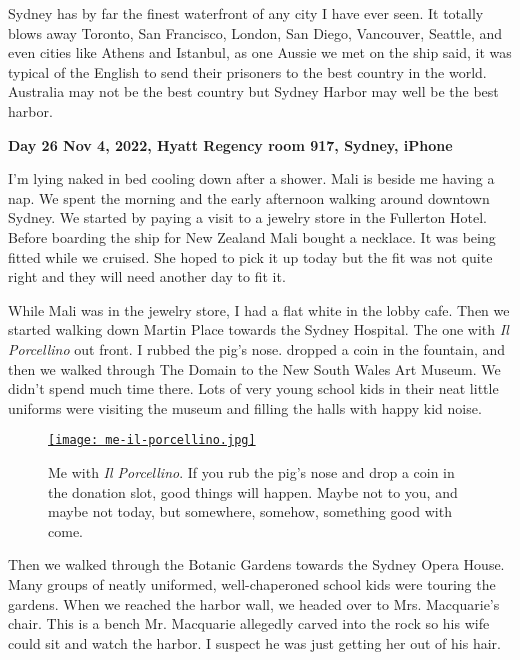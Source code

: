 Sydney has by far the finest waterfront of any city I have ever seen. It
totally blows away Toronto, San Francisco, London, San Diego, Vancouver,
Seattle, and even cities like Athens and Istanbul, as one Aussie we met
on the ship said, it was typical of the English to send their prisoners
to the best country in the world. Australia may not be the best country
but Sydney Harbor may well be the best harbor.

\textbf{Day 26 Nov 4, 2022, Hyatt Regency room 917, Sydney, iPhone}

I'm lying naked in bed cooling down after a shower. Mali is beside me
having a nap. We spent the morning and the early afternoon walking
around downtown Sydney. We started by paying a visit to a jewelry store
in the Fullerton Hotel. Before boarding the ship for New Zealand Mali bought a necklace. It was being fitted while we
cruised. She hoped to pick it up today but the fit was not quite right
and they will need another day to fit it.

While Mali was in the jewelry store, I had a flat white in the lobby
cafe. Then we started walking down Martin Place towards the Sydney
Hospital. The one with \emph{Il Porcellino} out front. I rubbed the
pig's nose. dropped a coin in the fountain, and then we walked through
The Domain to the New South Wales Art Museum. We didn't spend much time
there. Lots of very young school kids in their neat little uniforms were
visiting the museum and filling the halls with happy kid noise.


\captionsetup[figure]{labelformat=empty}
\begin{SCfigure}
 \centering
\href{https://conceptcontrol.smugmug.com/Trips/Overseas/Australia-New-Zealand-2022/i-kKGfSRz/A}{\texttt{[image: me-il-porcellino.jpg]}}
\caption[Me with \emph{Il Porcellino}]{Me with \emph{Il Porcellino}. If you rub the pig's nose and
drop a coin in the donation slot, good things will happen. Maybe not to
you, and maybe not today, but somewhere, somehow, something good with
come.}
\label{fig:7627x1}
\end{SCfigure}
 

Then we walked through the Botanic Gardens towards the Sydney Opera
House. Many groups of neatly uniformed, well-chaperoned school kids were
touring the gardens. When we reached the harbor wall, we headed over to
Mrs. Macquarie's chair. This is a bench Mr. Macquarie allegedly carved
into the rock so his wife could sit and watch the harbor. I suspect he
was just getting her out of his hair.

